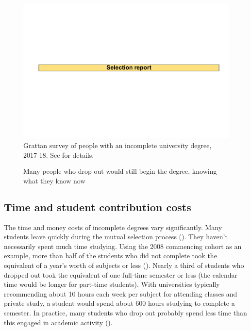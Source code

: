                 \begin{figure}
                    \caption{Many people who drop out would still begin the degree, knowing what they know now\label{fig:6}}%
                    \includegraphics[page=9]{atlas/selection_chartdeck.pdf} 
                    {Grattan survey of people with an incomplete university degree, 2017-18. See  for details.}
                \end{figure}


\subsection{Time and student contribution costs}\label{subsec:2.1.1}

The time and money costs of incomplete degrees vary significantly. Many students leave quickly during the mutual selection process (). They haven't necessarily spent much time studying. Using the 2008 commencing cohort as an example, more than half of the students who did not complete took the equivalent of a year's worth of subjects or less (). Nearly a third of students who dropped out took the equivalent of one full-time semester or less (the calendar time would be longer for part-time students). With universities typically recommending about 10 hours each week per subject for attending classes and private study, a student would spend about 600 hours studying to complete a semester. In practice, many students who drop out probably spend less time than this engaged in academic activity ().

